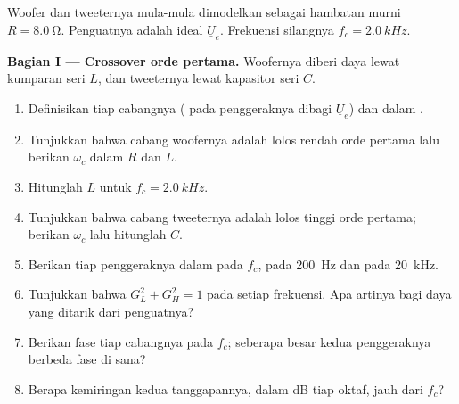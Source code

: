 \begin{problem}
\label{pb:b1:filters-transfer-functions:1}
Woofer dan tweeternya mula-mula dimodelkan sebagai hambatan murni
$R = \qty{8.0}{\ohm}$. Penguatnya adalah  ideal
$\underline U_e$. Frekuensi silangnya $f_c = \qty{2.0}{kHz}$.

\medskip
\noindent\textbf{Bagian I --- Crossover orde pertama.}
Woofernya diberi daya lewat kumparan seri $L$, dan tweeternya lewat
kapasitor seri $C$.
\begin{enumerate}
  \item Definisikan  tiap cabangnya ( pada
        penggeraknya dibagi $\underline U_e$) dan  dalam .
  \item Tunjukkan bahwa cabang woofernya adalah lolos rendah orde
        pertama lalu berikan  $\omega_c$ dalam $R$ dan $L$.
  \item Hitunglah $L$ untuk $f_c = \qty{2.0}{kHz}$.
  \item Tunjukkan bahwa cabang tweeternya adalah lolos tinggi orde
        pertama; berikan $\omega_c$ lalu hitunglah $C$.
  \item Berikan  tiap penggeraknya dalam  pada $f_c$,
        pada \qty{200}{Hz} dan pada \qty{20}{kHz}.
  \item Tunjukkan bahwa $G_L^2 + G_H^2 = 1$ pada setiap frekuensi. Apa
        artinya bagi daya yang ditarik dari penguatnya?
  \item Berikan fase tiap cabangnya pada $f_c$; seberapa besar 
        kedua penggeraknya berbeda fase di sana?
  \item Berapa kemiringan kedua tanggapannya, dalam dB tiap oktaf, jauh
        dari $f_c$?
\end{enumerate}


\end{problem}
